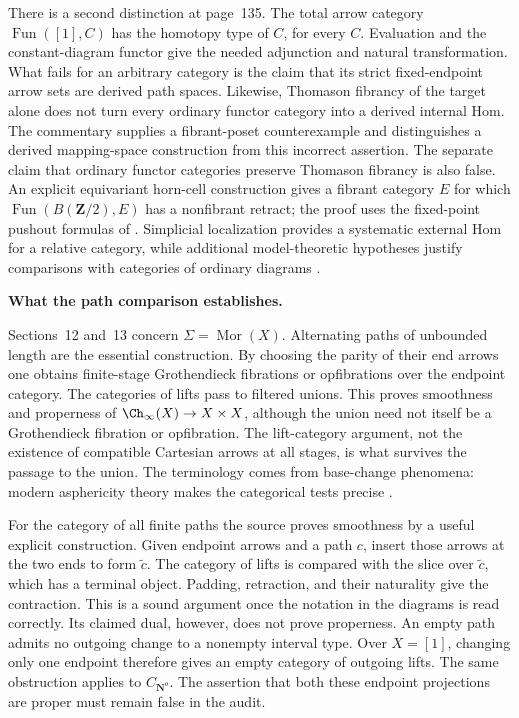 There is a second distinction at page~135.  The total arrow category
$\operatorname{Fun}([1],C)$ has the homotopy type of $C$, for every $C$.
Evaluation and the constant-diagram functor give the needed adjunction and
natural transformation.  What fails for an arbitrary category is the claim
that its strict fixed-endpoint arrow sets are derived path spaces.  Likewise,
Thomason fibrancy of the target alone does not turn every ordinary functor
category into a derived internal Hom.  The commentary supplies a fibrant-poset
counterexample and distinguishes a derived mapping-space construction from
this incorrect assertion.  The separate claim that ordinary functor categories
preserve Thomason fibrancy is also false.  An explicit equivariant horn-cell
construction gives a fibrant category $E$ for which
$\operatorname{Fun}(B(\mathbf Z/2),E)$ has a nonfibrant retract; the proof uses
the fixed-point pushout formulas of
\citet[Lemmas~4.7--4.8]{MayZakharevichStephan2017}.
Simplicial localization provides a systematic
external Hom for a relative category, while additional model-theoretic
hypotheses justify comparisons with categories of ordinary diagrams
\citep{DwyerKan1980Simplicial,DwyerKan1980Calculating,Groth2013,Cisinski2009LocallyConstant,Lurie2009HTT}.

\medskip\noindent\textbf{What the path comparison establishes.}

Sections~12 and~13 concern $\Sigma=\operatorname{Mor}(X)$.  Alternating paths
of unbounded length are the essential construction.  By choosing the parity
of their end arrows one obtains finite-stage Grothendieck fibrations or
opfibrations over the endpoint category.  The categories of lifts pass to
filtered unions.  This proves smoothness and properness of
$\Ch_\infty(X)\to X\times X$, although the union need not itself be a
Grothendieck fibration or opfibration.  The lift-category argument, not the
existence of compatible Cartesian arrows at all stages, is what survives the
passage to the union.  The terminology comes from base-change phenomena:
modern asphericity theory makes the categorical tests precise
\citep{Maltsiniotis2005Asphericite}.

For the category of all finite paths the source proves smoothness by a useful
explicit construction.  Given endpoint arrows and a path $c$, insert those
arrows at the two ends to form $\widetilde c$.  The category of lifts is
compared with the slice over $\widetilde c$, which has a terminal object.
Padding, retraction, and their naturality give the contraction.  This is a
sound argument once the notation in the diagrams is read correctly.  Its
claimed dual, however, does not prove properness.  An empty path admits no
outgoing change to a nonempty interval type.  Over $X=[1]$, changing only one
endpoint therefore gives an empty category of outgoing lifts.  The same
obstruction applies to $C_{\mathbf N^o}$.  The assertion that both these
endpoint projections are proper must remain false in the audit.

